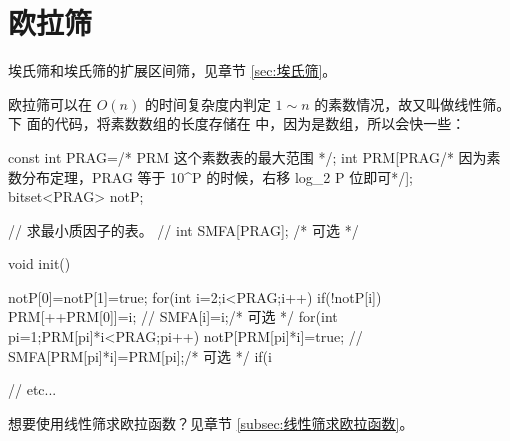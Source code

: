 \section{欧拉筛}
\label{sec:欧拉筛}


埃氏筛和埃氏筛的扩展区间筛，见章节 \ref{sec:埃氏筛}。

欧拉筛可以在 $O(n)$ 的时间复杂度内判定 $1 \sim n$ 的素数情况，故又叫做线性筛。下
面的代码，将素数数组的长度存储在  中，因为是数组，所以会快一些：
\begin{Cpp}
const int PRAG=/* PRM 这个素数表的最大范围 */;
int PRM[PRAG/* 因为素数分布定理，PRAG 等于 10^P 的时候，右移 log_2 P 位即可*/];
bitset<PRAG> notP;

// 求最小质因子的表。
// int SMFA[PRAG]; /* 可选 */

void init() {
  notP[0]=notP[1]=true;
  for(int i=2;i<PRAG;i++){
    if(!notP[i]){
      PRM[++PRM[0]]=i;
      // SMFA[i]=i;/* 可选 */
    }
    for(int pi=1;PRM[pi]*i<PRAG;pi++){
      notP[PRM[pi]*i]=true;
      // SMFA[PRM[pi]*i]=PRM[pi];/* 可选 */
      if(i%
    }
  }

  // etc...
}
\end{Cpp}

想要使用线性筛求欧拉函数？见章节 \ref{subsec:线性筛求欧拉函数}。
